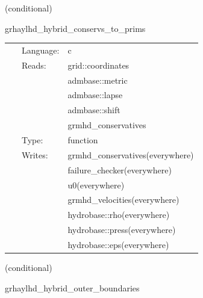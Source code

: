 \vspace{5mm}

   (conditional) 

\hspace{5mm} grhaylhd\_hybrid\_conservs\_to\_prims 

\hspace{5mm}{\it hybrid version of grhaylhd\_conservs\_to\_prims } 


\hspace{5mm}

 \begin{tabular*}{160mm}{cll} 
~ & Language:  & c \\ 
~ & Reads:  & grid::coordinates \\ 
~& ~ &admbase::metric\\ 
~& ~ &admbase::lapse\\ 
~& ~ &admbase::shift\\ 
~& ~ &grmhd\_conservatives\\ 
~ & Type:  & function \\ 
~ & Writes:  & grmhd\_conservatives(everywhere) \\ 
~& ~ &failure\_checker(everywhere)\\ 
~& ~ &u0(everywhere)\\ 
~& ~ &grmhd\_velocities(everywhere)\\ 
~& ~ &hydrobase::rho(everywhere)\\ 
~& ~ &hydrobase::press(everywhere)\\ 
~& ~ &hydrobase::eps(everywhere)\\ 
\end{tabular*} 


\vspace{5mm}

   (conditional) 

\hspace{5mm} grhaylhd\_hybrid\_outer\_boundaries 

\hspace{5mm}{\it hybrid version of grhaylhd\_outer\_boundaries } 


\hspace{5mm}

